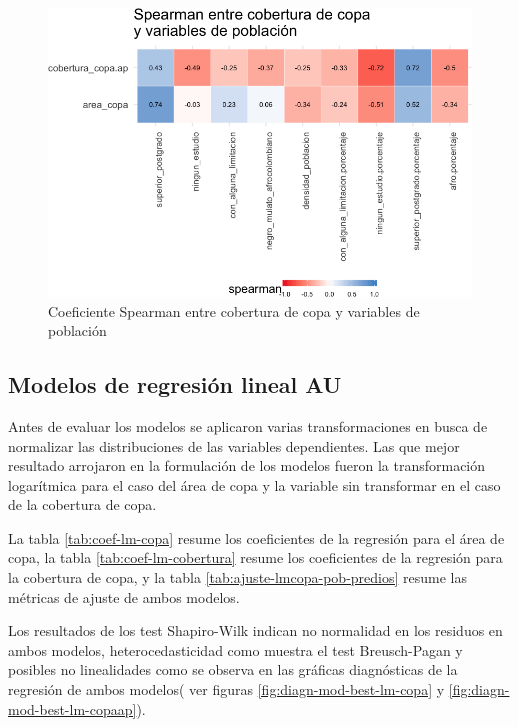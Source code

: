 \documentclass[12pt,a4paper,oneside, openany]{book}
\theoremstyle{definition}
\theoremstyle{definition}
\theoremstyle{definition}
\theoremstyle{remark}
\begin{document}
\begin{figure}[H]

{\centering \includegraphics[width=1\linewidth]{tesis-unigis_files/figure-latex/tile-copa-poblacion-spearman-1} 

}

\caption{Coeficiente Spearman entre cobertura de copa y variables de población}\label{fig:tile-copa-poblacion-spearman}
\end{figure}

\subsection{Modelos de regresión lineal
AU}\label{modelos-de-regresiuxf3n-lineal-au}

Antes de evaluar los modelos se aplicaron varias transformaciones en
busca de normalizar las distribuciones de las variables dependientes.
Las que mejor resultado arrojaron en la formulación de los modelos
fueron la transformación logarítmica para el caso del área de copa y la
variable sin transformar en el caso de la cobertura de copa.

La tabla \ref{tab:coef-lm-copa} resume los coeficientes de la regresión
para el área de copa, la tabla \ref{tab:coef-lm-cobertura} resume los
coeficientes de la regresión para la cobertura de copa, y la tabla
\ref{tab:ajuste-lmcopa-pob-predios} resume las métricas de ajuste de
ambos modelos.

Los resultados de los test Shapiro-Wilk indican no normalidad en los
residuos en ambos modelos, heterocedasticidad como muestra el test
Breusch-Pagan y posibles no linealidades como se observa en las gráficas
diagnósticas de la regresión de ambos modelos( ver figuras
\ref{fig:diagn-mod-best-lm-copa} y \ref{fig:diagn-mod-best-lm-copaap}).
\end{document}
